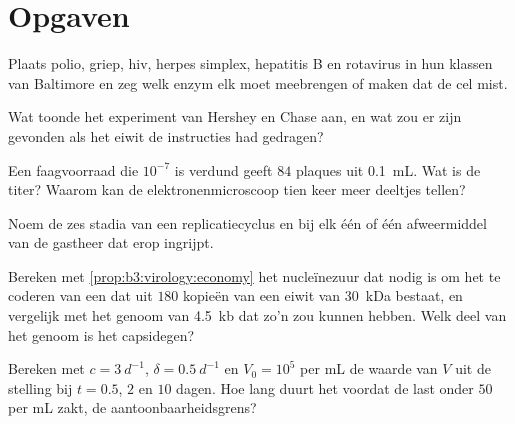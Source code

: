 \section{Opgaven}

\begin{exercise}[$\star$]\label{exo:b3:virology:1}
Plaats polio, griep, hiv, herpes simplex, hepatitis B en rotavirus in
hun klassen van Baltimore en zeg welk enzym elk moet meebrengen of
maken dat de cel mist.
\end{exercise}

\begin{exercise}[$\star$]\label{exo:b3:virology:2}
Wat toonde het experiment van Hershey en Chase aan, en wat zou er zijn
gevonden als het eiwit de instructies had gedragen?
\end{exercise}

\begin{exercise}[$\star$]\label{exo:b3:virology:3}
Een faagvoorraad die $10^{-7}$ is verdund geeft $84$ plaques uit
\qty{0.1}{mL}. Wat is de titer? Waarom kan de elektronenmicroscoop tien
keer meer deeltjes tellen?
\end{exercise}

\begin{exercise}[$\star$]\label{exo:b3:virology:4}
Noem de zes stadia van een replicatiecyclus en bij elk één  of één afweermiddel van de gastheer dat erop ingrijpt.
\end{exercise}

\begin{exercise}[$\star\star$]\label{exo:b3:virology:5}
Bereken met \cref{prop:b3:virology:economy} het nucleïnezuur dat nodig
is om het  te coderen van een  dat uit $180$ kopieën van
een eiwit van \qty{30}{kDa} bestaat, en vergelijk met het genoom van
\qty{4.5}{kb} dat zo'n  zou kunnen hebben. Welk deel van het
genoom is het capsidegen?
\end{exercise}

\begin{exercise}[$\star\star$]\label{exo:b3:virology:6}
Bereken met $c = \qty{3}{d^{-1}}$, $\delta = \qty{0.5}{d^{-1}}$ en $V_{0} =
10^{5}$ per mL de waarde van $V$ uit de stelling bij $t = 0.5$, $2$ en
$10$ dagen. Hoe lang duurt het voordat de last onder $50$ per mL zakt,
de aantoonbaarheidsgrens?
\end{exercise}

